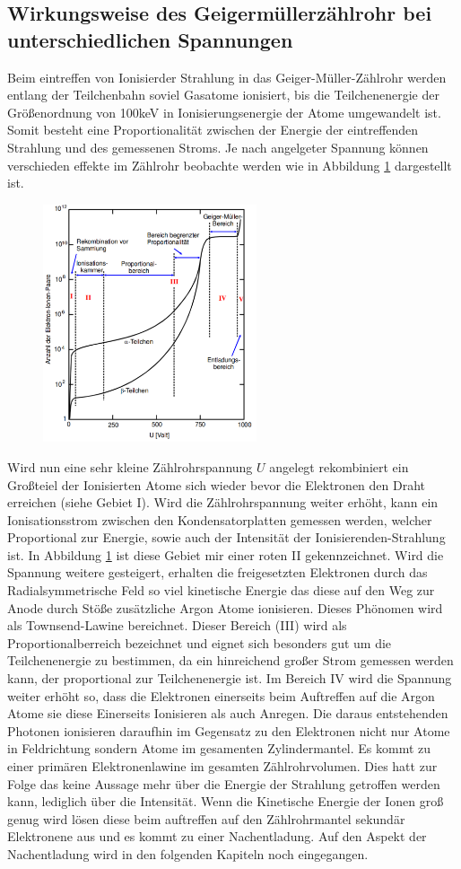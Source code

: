 \subsection{Wirkungsweise des Geigermüllerzählrohr bei unterschiedlichen Spannungen}
Beim eintreffen von Ionisierder Strahlung in das Geiger-Müller-Zählrohr werden entlang der Teilchenbahn soviel Gasatome ionisiert, bis die Teilchenenergie der Größenordnung von 100keV in Ionisierungsenergie der Atome umgewandelt ist. Somit besteht eine Proportionalität zwischen der Energie der eintreffenden Strahlung und des gemessenen Stroms. Je nach angelgeter Spannung können verschieden effekte im Zählrohr beobachte werden wie in Abbildung \ref{fig:Geb} dargestellt ist.
\begin{figure}
  \centering
  \includegraphics[height=7cm]{picture/Gebiete.pdf}
  \caption{\cite{sample}}
  \label{fig:Geb}
\end{figure}
Wird nun eine sehr kleine Zählrohrspannung $U$ angelegt rekombiniert ein Großteiel der Ionisierten Atome sich wieder bevor die Elektronen den Draht erreichen (siehe Gebiet I). Wird die Zählrohrspannung weiter erhöht, kann ein Ionisationsstrom zwischen den Kondensatorplatten gemessen werden, welcher Proportional zur Energie, sowie auch der Intensität der Ionisierenden-Strahlung ist. In Abbildung \ref{fig:Geb} ist diese Gebiet mir einer roten II gekennzeichnet. Wird die Spannung weitere gesteigert, erhalten die freigesetzten Elektronen durch das Radialsymmetrische Feld so viel kinetische Energie das diese auf den Weg zur Anode durch Stöße zusätzliche Argon Atome ionisieren. Dieses Phönomen wird als Townsend-Lawine bereichnet. Dieser Bereich (III) wird als Proportionalberreich bezeichnet und eignet sich besonders gut um die Teilchenenergie zu bestimmen, da ein hinreichend großer Strom gemessen werden kann, der proportional zur Teilchenenergie ist. Im Bereich IV wird die Spannung weiter erhöht so, dass die Elektronen einerseits beim Auftreffen auf die Argon Atome sie diese Einerseits Ionisieren als auch Anregen. Die daraus entstehenden Photonen ionisieren daraufhin im Gegensatz zu den Elektronen nicht nur Atome in Feldrichtung sondern Atome im gesamenten Zylindermantel. Es kommt zu einer primären Elektronenlawine im gesamten Zählrohrvolumen. Dies hatt zur Folge das keine Aussage mehr über die Energie der Strahlung getroffen werden kann, lediglich über die Intensität. Wenn die Kinetische Energie der Ionen groß genug wird lösen diese beim auftreffen auf den Zählrohrmantel sekundär Elektronene aus und es kommt zu einer Nachentladung. Auf den Aspekt der Nachentladung wird in den folgenden Kapiteln noch eingegangen.


